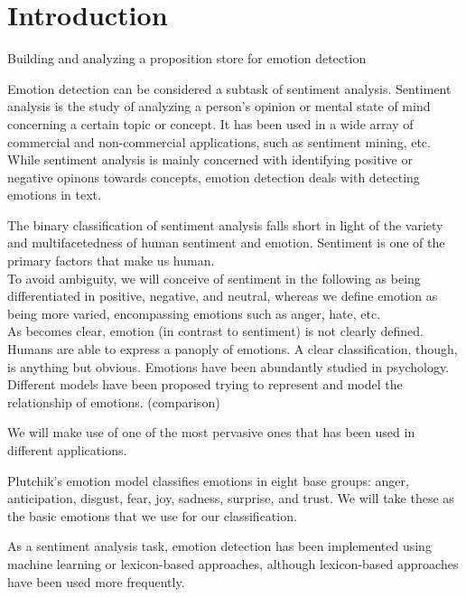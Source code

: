 
\chapter{Introduction} %

\label{ch:introduction} %


Building and analyzing a proposition store for emotion detection

Emotion detection can be considered a subtask of sentiment analysis.
Sentiment analysis is the study of analyzing a person's opinion or mental state of mind concerning a certain topic or concept. It has been used in a wide array of commercial and non-commercial applications, such as sentiment mining, etc. While sentiment analysis is mainly concerned with identifying positive or negative opinons towards concepts, emotion detection deals with detecting emotions in text.

The binary classification of sentiment analysis falls short in light of the variety and multifacetedness of human sentiment and emotion.
Sentiment is one of the primary factors that make us human.\\

To avoid ambiguity, we will conceive of sentiment in the following as being differentiated in positive, negative, and neutral, whereas we define emotion as being more varied, encompassing emotions such as anger, hate, etc.\\

As becomes clear, emotion (in contrast to sentiment) is not clearly defined. Humans are able to express a panoply of emotions. A clear classification, though, is anything but obvious. Emotions have been abundantly studied in psychology. Different models have been proposed trying to represent and model the relationship of emotions. (comparison)

We will make use of one of the most pervasive ones that has been used in different applications.

Plutchik's emotion model classifies emotions in eight base groups: anger, anticipation, disgust, fear, joy, sadness, surprise, and trust. We will take these as the basic emotions that we use for our classification.

As a sentiment analysis task, emotion detection has been implemented using machine learning or lexicon-based approaches, although lexicon-based approaches have been used more frequently.

